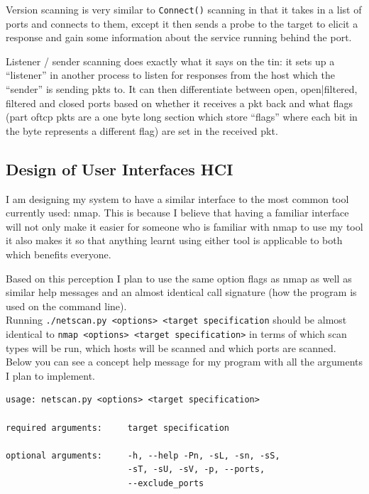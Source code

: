 \documentclass[titlepage]{article}
\let\Oldsubsection\subsection{}
\renewcommand{\subsection}{\FloatBarrier\Oldsubsection}
\begin{document}
Version scanning is very similar to \verb|Connect()| scanning in that it takes in a list of 
\glspl{port} and connects to them, except it then sends a probe to the target to elicit a response 
and gain some information about the \gls{service} running behind the \gls{port}.

Listener / sender scanning does exactly what it says on the tin: it sets up a ``listener'' in 
another process to listen for responses from the host which the ``sender'' is sending \glspl{pkt} 
to. It can then differentiate between open, open|filtered, filtered and closed \glspl{port} based on 
whether it receives a \gls{pkt} back and what flags (part of\gls{tcp} \glspl{pkt} are a one byte 
long section which store ``flags'' where each bit in the byte represents a different flag) are set 
in the received \gls{pkt}. 

\subsection{Design of User Interfaces HCI}

I am designing my system to have a similar interface to the most common tool currently used: nmap.
This is because I believe that having a familiar interface will not only make it easier for someone 
who is familiar with nmap to use my tool it also makes it so that anything learnt using either tool 
is applicable to both which benefits everyone.

Based on this perception I plan to use the same option flags as nmap as well as similar help messages 
and an almost identical call signature (how the program is used on the command line). \\
Running \verb|./netscan.py <options> <target specification| should be almost identical to
\verb|nmap <options> <target specification>| in terms of which scan types will be run, which hosts
will be scanned and which \glspl{port} are 
scanned. Below you can see a concept help message for my program with all the arguments I plan to
implement.

\begin{verbatim}
usage: netscan.py <options> <target specification>

required arguments:     target specification

optional arguments:     -h, --help -Pn, -sL, -sn, -sS,
                        -sT, -sU, -sV, -p, --ports,
                        --exclude_ports

\end{verbatim}
\end{document}
